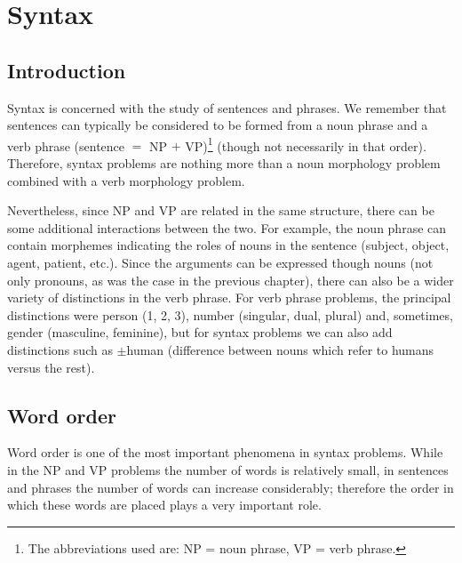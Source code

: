 \begin{refsection}
\hypertarget{syntax}{%
\chapter{Syntax}\label{chap-syntax}}

\section{Introduction}

 Syntax is concerned with the study of sentences and phrases. We remember that sentences can typically be considered to be formed from a noun phrase and a verb phrase (sentence $=$ NP $+$ VP)\footnote{The abbreviations used are: NP = noun phrase, VP = verb phrase.} (though not necessarily in that order). Therefore, syntax problems are nothing more than a noun morphology problem combined with a verb morphology problem.

Nevertheless, since NP and VP are related in the same structure, there can be some additional interactions between the two. For example, the noun phrase can  contain morphemes indicating the roles of nouns in the sentence (subject, object, agent, patient, etc.). Since the arguments can be expressed though nouns (not only pronouns, as was the case in the previous chapter), there can also be a wider variety of distinctions in the verb phrase. For verb phrase problems, the principal distinctions were person (1, 2, 3), number (singular, dual, plural) and, sometimes, gender (masculine, feminine), but for syntax problems we can also add distinctions such as $\pm$human (difference between nouns which refer to humans versus the rest).

\section{Word order}

 Word order is one of the most important phenomena in syntax problems. While in the NP and VP problems the number of words is relatively small, in sentences and phrases the number of words can increase considerably; therefore the order in which these words are placed plays a very important role.


\end{refsection}
